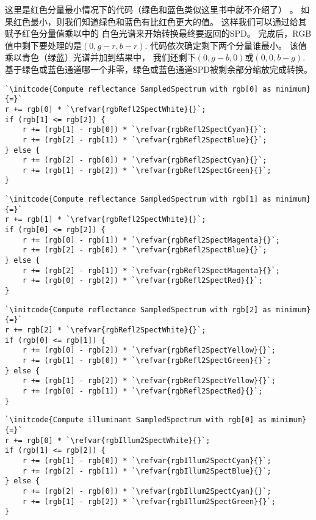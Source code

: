 这里是红色分量最小情况下的代码（绿色和蓝色类似这里书中就不介绍了）
。
如果红色最小，则我们知道绿色和蓝色有比红色更大的值。
这样我们可以通过给其赋予红色分量值乘以中的
白色光谱来开始转换最终要返回的SPD。
完成后，RGB值中剩下要处理的是$(0,g-r,b-r)$.
代码依次确定剩下两个分量谁最小。
该值乘以青色（绿蓝）光谱并加到结果中，
我们还剩下$(0,g-b,0)$或$(0,0,b-g)$.
基于绿色或蓝色通道哪一个非零，绿色或蓝色通道SPD被剩余部分缩放完成转换。
\begin{lstlisting}
`\initcode{Compute reflectance SampledSpectrum with rgb[0] as minimum}{=}`
r += rgb[0] * `\refvar{rgbRefl2SpectWhite}{}`;
if (rgb[1] <= rgb[2]) {
    r += (rgb[1] - rgb[0]) * `\refvar{rgbRefl2SpectCyan}{}`;
    r += (rgb[2] - rgb[1]) * `\refvar{rgbRefl2SpectBlue}{}`;
} else {
    r += (rgb[2] - rgb[0]) * `\refvar{rgbRefl2SpectCyan}{}`;
    r += (rgb[1] - rgb[2]) * `\refvar{rgbRefl2SpectGreen}{}`;
}
\end{lstlisting}
\begin{lstlisting}
`\initcode{Compute reflectance SampledSpectrum with rgb[1] as minimum}{=}`
r += rgb[1] * `\refvar{rgbRefl2SpectWhite}{}`;
if (rgb[0] <= rgb[2]) {
    r += (rgb[0] - rgb[1]) * `\refvar{rgbRefl2SpectMagenta}{}`;
    r += (rgb[2] - rgb[0]) * `\refvar{rgbRefl2SpectBlue}{}`;
} else {
    r += (rgb[2] - rgb[1]) * `\refvar{rgbRefl2SpectMagenta}{}`;
    r += (rgb[0] - rgb[2]) * `\refvar{rgbRefl2SpectRed}{}`;
}
\end{lstlisting}
\begin{lstlisting}
`\initcode{Compute reflectance SampledSpectrum with rgb[2] as minimum}{=}`
r += rgb[2] * `\refvar{rgbRefl2SpectWhite}{}`;
if (rgb[0] <= rgb[1]) {
    r += (rgb[0] - rgb[2]) * `\refvar{rgbRefl2SpectYellow}{}`;
    r += (rgb[1] - rgb[0]) * `\refvar{rgbRefl2SpectGreen}{}`;
} else {
    r += (rgb[1] - rgb[2]) * `\refvar{rgbRefl2SpectYellow}{}`;
    r += (rgb[0] - rgb[1]) * `\refvar{rgbRefl2SpectRed}{}`;
}
\end{lstlisting}
\begin{lstlisting}
`\initcode{Compute illuminant SampledSpectrum with rgb[0] as minimum}{=}`
r += rgb[0] * `\refvar{rgbIllum2SpectWhite}{}`;
if (rgb[1] <= rgb[2]) {
    r += (rgb[1] - rgb[0]) * `\refvar{rgbIllum2SpectCyan}{}`;
    r += (rgb[2] - rgb[1]) * `\refvar{rgbIllum2SpectBlue}{}`;
} else {
    r += (rgb[2] - rgb[0]) * `\refvar{rgbIllum2SpectCyan}{}`;
    r += (rgb[1] - rgb[2]) * `\refvar{rgbIllum2SpectGreen}{}`;
}
\end{lstlisting}
